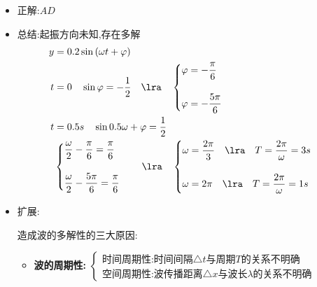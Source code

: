 \documentclass{article}
\begin{document}
\begin{itemize}
    \item 正解:\quad $AD$
    \item 总结:\quad 起振方向未知,存在多解
          \begin{align*}
              y & = 0.2\sin{(\omega t + \varphi)}                            \\
              t & = 0  \quad  \sin{\varphi} = -\dfrac{1}{2} \quad \lra \quad
              \begin{cases}
                  \varphi = - \dfrac{\pi}{6} \\
                  \,                         \\
                  \varphi = - \dfrac{5\pi}{6}
              \end{cases}                                     \\
              t & = 0.5s \quad \sin{0.5 \omega  + \varphi } = \dfrac{1}{2}   \\
                & \begin{cases}
                      \dfrac{\omega}{2} - \dfrac{\pi}{6} = \dfrac{\pi}{6} \\
                      \,                                                  \\
                      \dfrac{\omega}{2} - \dfrac{5\pi}{6} = \dfrac{\pi}{6}
                  \end{cases}
              \quad \lra  \quad
              \begin{cases}
                  \omega = \dfrac{2\pi}{3} \quad \lra \quad T = \dfrac{2\pi}{\omega} = 3s \\
                  \,                                                                      \\
                  \omega = 2\pi \quad \lra \quad T = \dfrac{2\pi}{\omega} = 1s
              \end{cases}
          \end{align*}

    \item 扩展:\quad

          造成波的多解性的三大原因:
          \begin{itemize}
              \item \textbf{波的周期性:}\hspace{1em}
                    $\begin{cases}
                            \text{时间周期性:时间间隔}\triangle t \text{与周期} T \text{的关系不明确} \\
                            \text{空间周期性:波传播距离}\triangle x \text{与波长} \lambda \text{的关系不明确}
                        \end{cases}$


\end{itemize}
\end{itemize}
\end{document}
